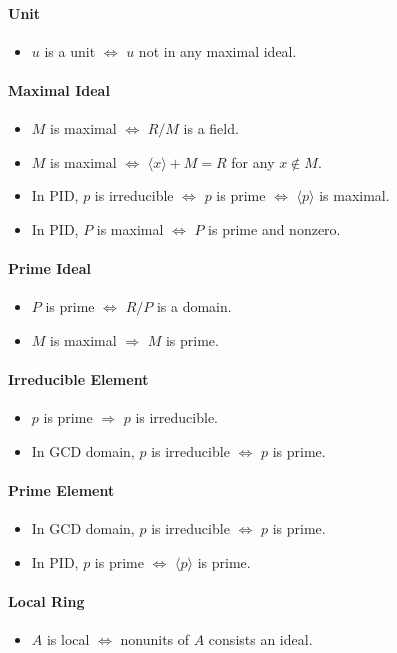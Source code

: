 \documentclass{article}
\begin{document}
\paragraph*{Unit}
\begin{itemize}
    \item $u$ is a unit $\Leftrightarrow$ $u$ not in any maximal ideal.
\end{itemize}

\paragraph*{Maximal Ideal}
\begin{itemize}
    \item $M$ is maximal $\Leftrightarrow$ $R/M$ is a field.
    \item $M$ is maximal $\Leftrightarrow$ $\langle x \rangle + M = R$ for any $x\notin M$.
    \item In PID, $p$ is irreducible $\Leftrightarrow$ $p$ is prime $\Leftrightarrow$ $\langle p \rangle$ is maximal.
    \item In PID, $P$ is maximal $\Leftrightarrow$ $P$ is prime and nonzero.
\end{itemize}

\paragraph*{Prime Ideal}
\begin{itemize}
    \item $P$ is prime $\Leftrightarrow$ $R/P$ is a domain.
    \item $M$ is maximal $\Rightarrow$ $M$ is prime.
\end{itemize}

\paragraph*{Irreducible Element}
\begin{itemize}
    \item $p$ is prime $\Rightarrow$ $p$ is irreducible.
    \item In GCD domain, $p$ is irreducible $\Leftrightarrow$ $p$ is prime.
\end{itemize}

\paragraph*{Prime Element}
\begin{itemize}
    \item In GCD domain, $p$ is irreducible $\Leftrightarrow$ $p$ is prime.
    \item In PID, $p$ is prime $\Leftrightarrow$ $\langle p \rangle$ is prime.
\end{itemize}

\paragraph*{Local Ring}
\begin{itemize}
    \item $A$ is local $\Leftrightarrow$ nonunits of $A$ consists an ideal.
\end{itemize}

% 
% 
\end{document}
